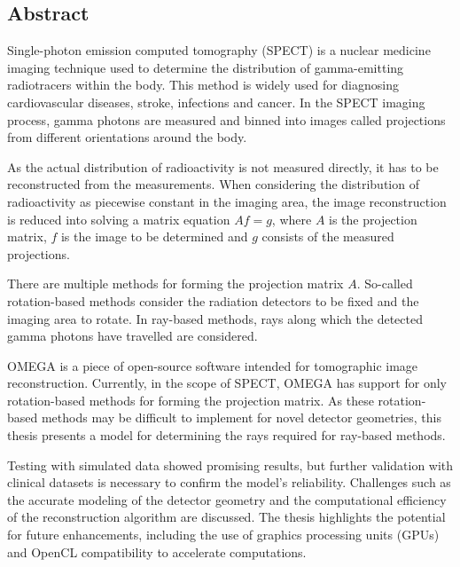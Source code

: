 \begin{titlepage}
    \section*{Abstract}
    Single-photon emission computed tomography (SPECT) is a nuclear medicine imaging technique used to determine the distribution of gamma-emitting radiotracers within the body. This method is widely used for diagnosing cardiovascular diseases, stroke, infections and cancer. In the SPECT imaging process, gamma photons are measured and binned into images called projections from different orientations around the body.
    
    As the actual distribution of radioactivity is not measured directly, it has to be reconstructed from the measurements. When considering the distribution of radioactivity as piecewise constant in the imaging area, the image reconstruction is reduced into solving a matrix equation $Af=g$, where $A$ is the projection matrix, $f$ is the image to be determined and $g$ consists of the measured projections.
    
    There are multiple methods for forming the projection matrix $A$. So-called rotation-based methods consider the radiation detectors to be fixed and the imaging area to rotate. In ray-based methods, rays along which the detected gamma photons have travelled are considered.
    
    OMEGA is a piece of open-source software intended for tomographic image reconstruction. Currently, in the scope of SPECT, OMEGA has support for only rotation-based methods for forming the projection matrix. As these rotation-based methods may be difficult to implement for novel detector geometries, this thesis presents a model for determining the rays required for ray-based methods. 
    
    Testing with simulated data showed promising results, but further validation with clinical datasets is necessary to confirm the model's reliability. Challenges such as the accurate modeling of the detector geometry and the computational efficiency of the reconstruction algorithm are discussed. The thesis highlights the potential for future enhancements, including the use of graphics processing units (GPUs) and OpenCL compatibility to accelerate computations.
\end{titlepage}